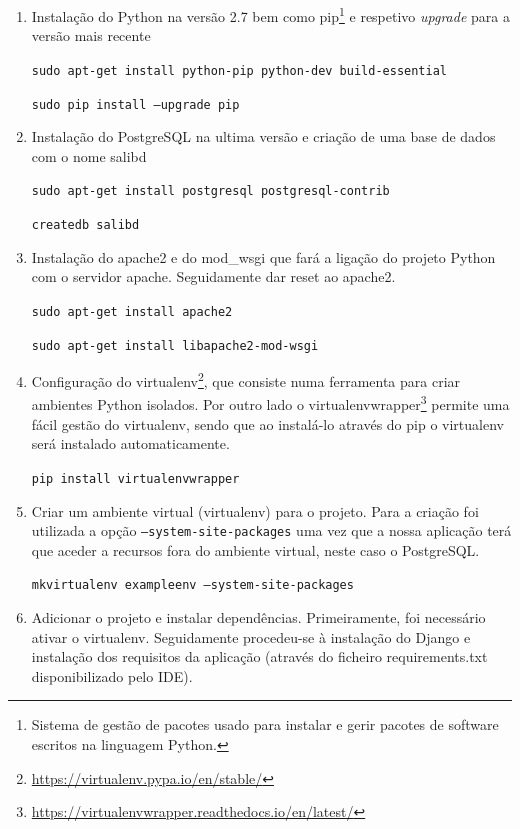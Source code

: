 



\begin{enumerate}
	\item Instalação do Python na versão 2.7 bem como pip\footnote{Sistema de gestão de pacotes usado para instalar e gerir pacotes de software escritos na linguagem Python.} e respetivo \textit{upgrade} para a versão mais recente
	
	\texttt{sudo apt-get install python-pip python-dev build-essential}
	
	\texttt{sudo pip install --upgrade pip}
	
	
	\item Instalação do PostgreSQL na ultima versão e criação de uma base de dados com o nome salibd
	
	
	\texttt{sudo apt-get install postgresql postgresql-contrib}

	\texttt{createdb salibd}	
	
	
	\item Instalação do apache2 e do mod\_wsgi que fará a ligação do projeto Python com o servidor apache. Seguidamente dar reset ao apache2.
	
	\texttt{sudo apt-get install apache2}
	
	\texttt{sudo apt-get install libapache2-mod-wsgi}
	
	
	\item Configuração do virtualenv\footnote{\url{https://virtualenv.pypa.io/en/stable/}}, que consiste numa ferramenta para criar ambientes Python isolados. Por outro lado o virtualenvwrapper\footnote{\url{https://virtualenvwrapper.readthedocs.io/en/latest/}} permite uma fácil gestão do virtualenv, sendo que ao instalá-lo através do pip o virtualenv será instalado automaticamente. 
	
	
	\texttt{pip install virtualenvwrapper}
	
	 
	\item Criar um ambiente virtual (virtualenv) para o projeto. Para a criação foi utilizada a opção \texttt{--system-site-packages} uma vez que a nossa aplicação terá que aceder a recursos fora do ambiente virtual, neste caso o PostgreSQL. 
	
	\texttt{mkvirtualenv exampleenv --system-site-packages}
	
	
	\item Adicionar o projeto e instalar dependências. Primeiramente, foi necessário ativar o virtualenv. Seguidamente procedeu-se à instalação do Django e instalação dos requisitos da aplicação (através do ficheiro requirements.txt disponibilizado pelo IDE). 
	

\end{enumerate}

